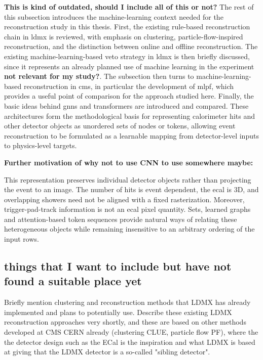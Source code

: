 \textbf{This is kind of outdated, should I include all of this or not?} The rest of this subsection introduces the machine-learning context needed for the reconstruction study in this thesis. First, the existing rule-based reconstruction chain in \gls{ldmx} is reviewed, with emphasis on clustering, particle-flow-inspired reconstruction, and the distinction between online and offline reconstruction. The existing machine-learning-based veto strategy in \gls{ldmx} is then briefly discussed, since it represents an already planned use of machine learning in the experiment \textbf{not relevant for my study?}. The subsection then turns to machine-learning-based reconstruction in \gls{cms}, in particular the development of \gls{mlpf}, which provides a useful point of comparison for the approach studied here. Finally, the basic ideas behind \glspl{gnn} and transformers are introduced and compared. These architectures form the methodological basis for representing calorimeter hits and other detector objects as unordered sets of nodes or tokens, allowing event reconstruction to be formulated as a learnable mapping from detector-level inputs to physics-level targets.

\textbf{Further motivation of why not to use CNN to use somewhere maybe:}

This representation preserves individual detector objects rather than
projecting the event to an image. The number of hits is event dependent, the
\gls{ecal} is 3D, and overlapping showers need not be aligned
with a fixed rasterization. Moreover, trigger-pad-track information is not an
\gls{ecal} pixel quantity. Sets, learned graphs and attention-based token
sequences provide natural ways of relating these heterogeneous objects while
remaining insensitive to an arbitrary ordering of the input rows.

\subsection{things that I want to include but have not found a suitable place yet}

Briefly mention clustering and reconstruction methods that LDMX has already implemented and plans to potentially use. Describe these existing LDMX reconstruction approaches very shortly, and these are based on other methods developed at CMS CERN already (clustering CLUE, particle flow PF), where the the detector design such as the ECal is the inspiration and what LDMX is based at giving that the LDMX detector is a so-called "sibling detector".

